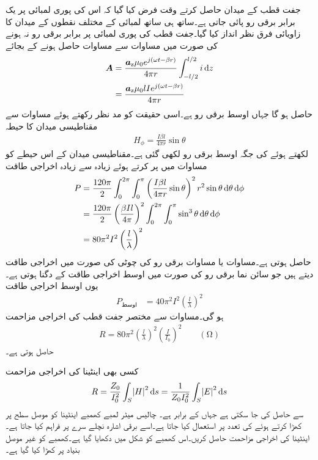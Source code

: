 جفت قطب کے میدان حاصل کرتے وقت فرض کیا گیا کہ اس کی پوری لمبائی پر یک برابر برقی رو  پائی جاتی ہے۔ساتھ ہی ساتھ لمبائی  کے مختلف نقطوں کے میدان کا زاویائی فرق نظر انداز کیا گیا۔جفت قطب کی پوری لمبائی پر برابر برقی رو نہ ہونے  کی صورت میں مساوات  سے مساوات  حاصل ہونے کے بجائے
\begin{align*}
\kvec{A} &=\frac{\az \mu_0  e^{j(\omega t -\beta r)}}{4\pi r}\int_{-l/2}^{l/2} i \dif z \\
&=\frac{\az \mu_0 l I e^{j(\omega t -\beta r)}}{4\pi r}
\end{align*}
حاصل ہو گا جہاں  اوسط برقی رو ہے۔اسی حقیقت کو مد نظر رکھتے ہوئے مساوات  سے مقناطیسی میدان کا حیطہ
\begin{align}
H_{\phi}=\frac{I \beta l}{4\pi r} \sin \theta 
\end{align}
لکھتے ہوئے  کی جگہ اوسط برقی رو  لکھی گئی ہے۔مقناطیسی میدان کے اس حیطے  کو مساوات  میں پر کرتے ہوئے زیادہ سے زیادہ اخراجی طاقت 
 \begin{align*}
P&=\frac{120\pi}{2 }\int_0^{2\pi}\int_0^{\pi} \left(\frac{I \beta l}{4\pi r} \sin \theta \right)^2  r^2 \sin \theta \dif \theta \dif \phi\\
&=\frac{120\pi}{2 }\left(\frac{\beta I l}{4\pi}\right)^2\int_0^{2\pi}\int_0^{\pi}  \sin^3 \theta \dif \theta \dif \phi\\
&=80 \pi^2 I^2\left(\frac{l}{\lambda}\right)^2
\end{align*} 
حاصل ہوتی ہے۔مساوات  یا مساوات  برقی رو کی چوٹی  کی صورت میں اخراجی  طاقت دیتے ہیں جو سائن نما برقی رو کی صورت میں اوسط اخراجی طاقت کے دگنا ہوتی ہے۔یوں اوسط اخراجی طاقت
\begin{align}
P_{\text{اوسط}}  &= 40 \pi^2 I^2\left(\frac{l}{\lambda}\right)^2
\end{align} 
ہو گی۔مساوات  سے مختصر جفت قطب کی اخراجی مزاحمت 
\begin{align}\label{مساوات_اینٹینا_اخراجی_مزاحمت_جفت_قطب}
R=80 \pi^2 \left(\frac{l}{\lambda}\right)^2  \left(\frac{I}{I_0} \right)^2\quad \quad (\si{\ohm})
\end{align}
حاصل ہوتی ہے۔

کسی بھی اینٹینا کی اخراجی مزاحمت
\begin{align}
R=\frac{Z_0}{I_0^2} \int_S \abs{H}^2 \dif s=\frac{1}{Z_0 I_0^2} \int_S \abs{E}^2 \dif s
\end{align}
سے حاصل کی جا سکتی ہے جہاں  کے برابر ہے۔
چالیس میٹر لمبے کھمبے اینٹینا کو موصل سطح پر کھڑا کرتے ہوئے   کی تعدد پر استعمال کیا جاتا ہے۔اسے برقی اشارہ نچلے سرے پر فراہم کیا جاتا ہے۔اینٹینا کی اخراجی مزاحمت حاصل کریں۔اس کھمبے کو شکل  میں دکھایا گیا ہے۔کھمبے کو غیر موصل بنیاد پر کھڑا کیا گیا ہے۔

